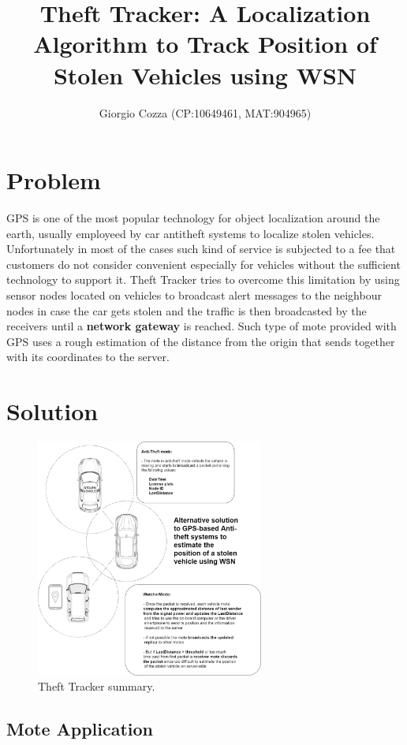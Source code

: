 \documentclass[]{article}
\title{Theft Tracker: A Localization Algorithm to Track Position of Stolen Vehicles using WSN}
\author{Giorgio Cozza (CP:10649461, MAT:904965)}
\begin{document}
\maketitle

\section{Problem}

GPS is one of the most popular technology for object localization around the earth, usually employeed by car antitheft systems to localize stolen vehicles. Unfortunately in most of the cases such kind of service is subjected to a fee that customers do not consider convenient especially for vehicles without the sufficient technology to support it. 
Theft Tracker tries to overcome this limitation by using sensor nodes located on vehicles to broadcast alert messages to the neighbour nodes in case the car gets stolen and the traffic is then broadcasted by the receivers until a \textbf{network gateway} is reached. Such type of mote provided with GPS uses a rough estimation of the distance from the origin that sends together with its coordinates to the server.


\section{Solution}

\begin{figure}
\vspace{-50pt}
\includegraphics[width=7.5cm]{./images/theft_tracker_summary.png}
\caption{Theft Tracker summary.}\label{tt-fig:1}
\vspace{-70pt}
\end{figure}

\subsection{Mote Application}
\end{document}
